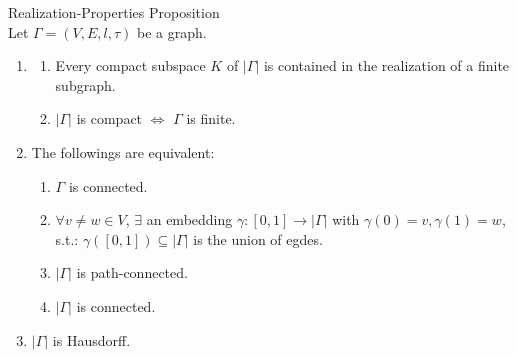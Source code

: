 \begin{proposition}{Realization-Properties Proposition}\\
Let $\Gamma= (V,E,l,\tau)$ be a graph.
\begin{enumerate}
    \item \begin{enumerate}
        \item Every compact subspace $K$ of $|\Gamma|$ is contained in the realization of a finite subgraph.
        \item $|\Gamma|$ is compact $\Leftrightarrow$ $\Gamma$ is finite.
    \end{enumerate}

    \item The followings are equivalent:
    \begin{enumerate}
        \item $\Gamma$ is connected.
        \item $\forall v\neq w \in V$, $\exists$ an embedding $\gamma: [0,1] \to |\Gamma|$ with $\gamma(0)=v,\gamma (1)=w$, s.t.: $\gamma([0,1]) \subseteq |\Gamma|$ is the union of egdes.
        \item $|\Gamma|$ is path-connected.
        \item $|\Gamma|$ is connected.
    \end{enumerate}

    \item $|\Gamma|$ is Hausdorff.
\end{enumerate}
\end{proposition}

